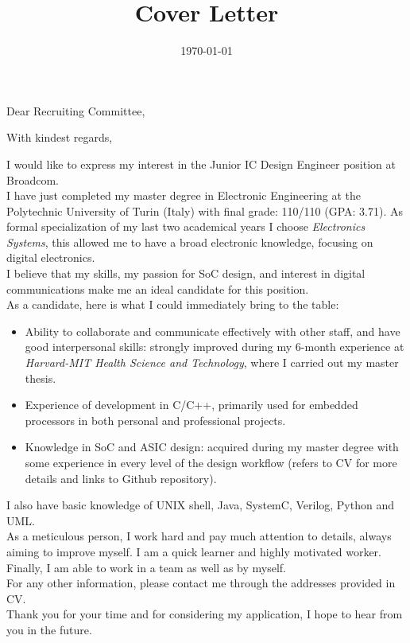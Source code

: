 \documentclass[11pt,a4paper]{moderncv}        %
\title{Cover Letter}                               %
\begin{document}
\date{\today}%

\opening{Dear Recruiting Committee,}
\closing{With kindest regards,}


\makelettertitle
\vspace{-5mm}
I would like to express my interest in the Junior IC Design Engineer position at Broadcom.\\
I have just completed my master degree in Electronic Engineering at the Polytechnic University of Turin (Italy) with final grade: 110/110 (GPA: 3.71). 
As formal specialization of my last two academical years I choose \textit{Electronics Systems}, this allowed me to have a broad electronic knowledge, focusing on digital electronics. \\  
I believe that my skills, my passion for SoC design, and interest in digital communications  make me an ideal candidate for this position.\\
As a candidate, here is what I could immediately bring to the table:
\begin{itemize}
\item {Ability to collaborate and communicate effectively with other staff, and have good interpersonal skills}: strongly improved during my 6-month experience at \textit{Harvard-MIT Health Science and Technology}, where I carried out my master thesis.
\item Experience of development in C/C++, primarily  used for embedded processors in both personal and professional projects.
\item Knowledge in SoC and ASIC design: acquired during my master degree with some experience in every level of the design workflow (refers to CV for more details and links to Github repository).
\end{itemize}
\vspace{-1mm}

I also have basic knowledge of UNIX shell, Java, SystemC, Verilog, Python and UML. \\
As a meticulous person, I work hard and pay much attention to details, always aiming to improve myself. I am a quick learner and highly motivated worker.
Finally, I am able to work in a team as well as by myself.\\
For any other information, please contact me through the addresses provided in CV.\\
Thank you for your time and for considering my application, I hope to hear from you in the future.\\
\makeletterclosing
\vspace{-4mm}
\end{document}
